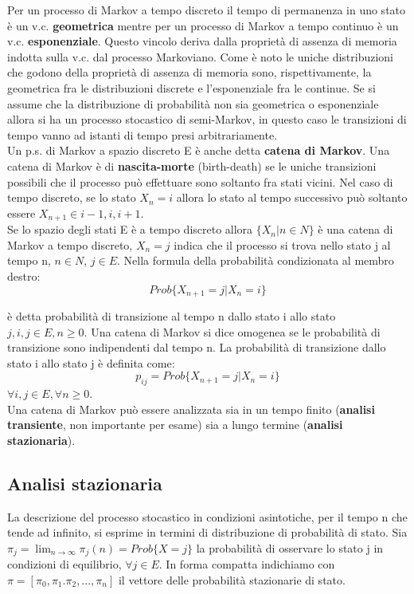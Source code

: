 Per un processo di Markov a tempo discreto il tempo di permanenza in uno stato è un v.c. \textbf{geometrica} mentre per un processo di Markov a tempo continuo è un v.c. \textbf{esponenziale}. Questo vincolo deriva
dalla proprietà di assenza di memoria indotta sulla v.c. dal processo Markoviano. Come è noto le uniche distribuzioni che godono della proprietà di assenza di memoria sono, rispettivamente, la geometrica fra le distribuzioni discrete e l’esponenziale fra le continue. Se si assume che la distribuzione di probabilità non sia geometrica o esponenziale allora si ha un processo stocastico di semi-Markov, in questo caso le transizioni di tempo vanno ad istanti di tempo presi arbitrariamente. \\
Un p.s. di Markov a spazio discreto E è anche detta \textbf{catena di Markov}.
Una catena di Markov è di \textbf{nascita-morte} (birth-death) se le uniche transizioni possibili che il processo può effettuare sono soltanto fra stati vicini. Nel caso di tempo discreto, se lo stato $X_n=i$ allora lo stato al tempo successivo può soltanto essere $X_{n+1}\in{i-1, i, i+1}$. \\
Se lo spazio degli stati E è a tempo discreto allora $\{X_n | n \in N\}$ è una catena di Markov a tempo discreto, $X_n = j$ indica che il processo si trova nello stato j al tempo n, $n \in N$, $j \in E$. Nella formula della probabilità condizionata al membro destro:
\[Prob\{X_{n+1} = j | X_n = i\}\]

è detta probabilità di transizione al tempo n dallo stato i allo stato $j,i,j\in E, n \geq 0$.
Una catena di Markov si dice omogenea se le probabilità di transizione sono indipendenti dal tempo n. La probabilità di transizione dallo stato i allo stato j è definita come:
\[ p_{ij} = Prob\{X_{n+1} = j | X_n = i\}\]
$\forall i,j \in E, \forall n \geq 0$. \\
Una catena di Markov può essere analizzata sia in un tempo finito (\textbf{analisi transiente}, non importante per esame) sia a lungo termine (\textbf{analisi stazionaria}).

\subsection{Analisi stazionaria}
La descrizione del processo stocastico in condizioni asintotiche, per il tempo n che tende ad infinito, si esprime in termini di distribuzione di probabilità di stato. Sia $ \pi_j = \lim_{n \to \infty} \pi_j(n) = Prob\{X=j\}$ la probabilità di osservare lo stato j in condizioni di equilibrio, $\forall j \in E$. In forma compatta indichiamo con $\pi =[\pi_0, \pi_1. \pi_2,...,\pi_n]$ il vettore delle probabilità stazionarie di stato.

